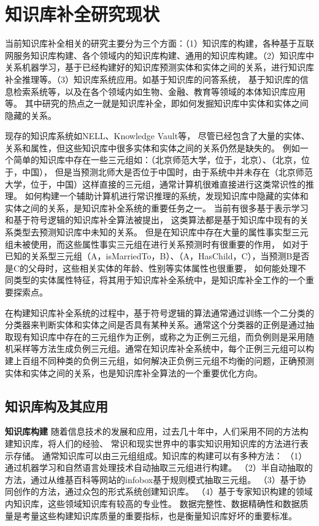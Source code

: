 

\chapter{知识库补全研究现状}
\label{cha:related-work}

当前知识库补全相关的研究主要分为三个方面：（1）知识库的构建，各种基于互联网服务知识库构建、各个领域内的知识库构建、通用的知识库构建。（2）知识库中关系机器学习，基于已经构建好的知识库预测实体和实体之间的关系，进行知识库补全推理等。（3）知识库系统应用。如基于知识库的问答系统，
基于知识库的信息检索系统等，以及在各个领域内如生物、金融、教育等领域的本体知识库应用等。
其中研究的热点之一就是知识库补全，即如何发掘知识库中实体和实体之间隐藏的关系。

现存的知识库系统如NELL、Knowledge Vault等，
尽管已经包含了大量的实体、关系和属性，但这些知识库中很多实体和实体之间的关系仍然是缺失的。
例如一个简单的知识库中存在一些三元组如：（北京师范大学，位于，北京）、（北京，位于，中国），
但是当预测北师大是否位于中国时，由于系统中并未存在（北京师范大学，位于，中国）这样直接的三元组，通常计算机很难直接进行这类常识性的推理。
如何构建一个辅助计算机进行常识推理的系统，发现知识库中隐藏的实体和实体之间的关系，是知识库补全系统的重要任务之一。
当前有很多基于表示学习和基于符号逻辑的知识库补全算法被提出，
这类算法都是基于知识库中现有的关系类型去预测知识库中未知的关系。
但是在知识库中存在大量的属性事实型三元组未被使用，而这些属性事实三元组在进行关系预测时有很重要的作用，
如对于已知的关系型三元组（A，isMarriedTo，B）、（A，HasChild，C），当预测B是否是C的父母时，这些相关实体的年龄、性别等实体属性也很重要，
如何能处理不同类型的实体属性特征，将其用于知识库补全系统中，是知识库补全工作的一个重要探索点。

在构建知识库补全系统的过程中，基于符号逻辑的算法通常通过训练一个二分类的分类器来判断实体和实体之间是否具有某种关系。通常这个分类器的正例是通过抽取现有知识库中存在的三元组作为正例，或称之为正例三元组，而负例则是采用随机采样等方法生成负例三元组。通常在知识库补全系统中，每个正例三元组可以构建上百组不同种类的负例三元组，如何解决正负例三元组不均衡的问题，正确预测实体和实体之间的关系，也是知识库补全算法的一个重要优化方向。

\section{知识库构及其应用}

\textbf{知识库构建} 随着信息技术的发展和应用，过去几十年中，人们采用不同的方法构建知识库，将人们的经验、
常识和现实世界中的事实知识用知识库的方法进行表示存储。
通常知识库可以由三元组组成。知识库的构建可以有多种方法：
（1）通过机器学习和自然语言处理技术自动抽取三元组\cite{Weikum2010FromIT}进行构建。
（2）半自动抽取的方法，通过从维基百科等网站的infobox基于规则模式抽取三元组。
（3）基于协同创作\cite{Vrandecic2014WikidataAF}的方法，通过众包的形式系统创建知识库。
（4）基于专家知识构建的领域内知识库，这些领域知识库有较高的专业性。
数据完整性、数据精确性和数据质量是考量这些构建知识库质量的重要指标，也是衡量知识库好坏的重要标准。


